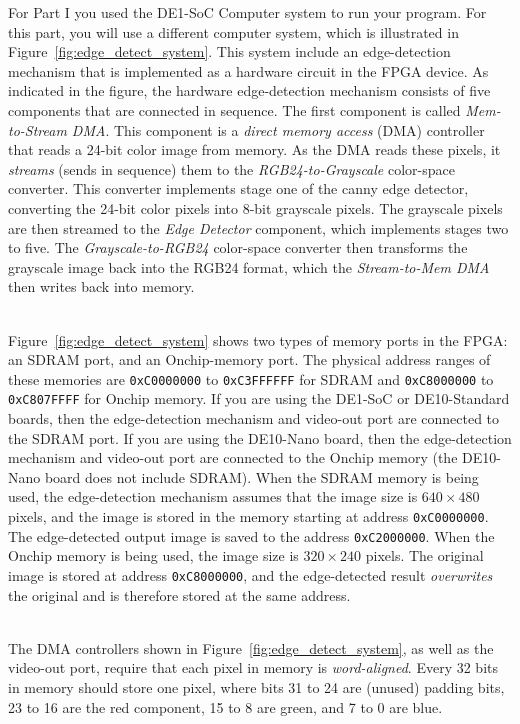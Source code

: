 \documentclass[epsfig,10pt,fullpage]{article}
\begin{document}
For Part I you used the DE1-SoC Computer system to run your program. For this part, you will 
use a different computer system, which is illustrated in Figure~\ref{fig:edge_detect_system}.
This system include an edge-detection mechanism that is implemented as a hardware circuit 
in the FPGA device. As indicated in the figure, the hardware edge-detection mechanism 
consists of five components that are connected in sequence. The first component is called
{\it Mem-to-Stream DMA}. This component is a {\it direct memory access} (DMA) controller that 
reads a 24-bit color image from memory. As the DMA reads these pixels, it
{\it streams} (sends in sequence) them to the {\it RGB24-to-Grayscale} color-space converter.
This converter implements stage one of the canny edge detector, converting the 24-bit color 
pixels into 8-bit grayscale pixels. The grayscale pixels are then streamed to the 
{\it Edge Detector} component, which implements stages two to five. The 
{\it Grayscale-to-RGB24} color-space converter then transforms the grayscale image back into 
the RGB24 format, which the {\it Stream-to-Mem DMA} then writes back into memory. 

~\\
\noindent
Figure~\ref{fig:edge_detect_system} shows two types of memory ports in the FPGA: an SDRAM
port, and an Onchip-memory port. The physical address ranges of these memories are
\texttt{0xC0000000} to \texttt{0xC3FFFFFF} for SDRAM and \texttt{0xC8000000} to
\texttt{0xC807FFFF} for Onchip memory. If you are using the DE1-SoC or DE10-Standard
boards, then the edge-detection mechanism and video-out port are connected to the SDRAM port.
If you are using the DE10-Nano board, then the edge-detection mechanism and video-out port 
are connected to the Onchip memory (the DE10-Nano board does not include SDRAM). When the 
SDRAM memory is being used, the edge-detection mechanism assumes that the image size is 
$640 \times 480$ pixels, and the image is stored in the memory starting at address
\texttt{0xC0000000}. The edge-detected output image is saved to the address \texttt{0xC2000000}.
When the Onchip memory is being used, the image size is $320 \times 240$ pixels. The
original image is stored at address \texttt{0xC8000000}, and the edge-detected result
{\it overwrites} the original and is therefore stored at the same address.

~\\
\noindent
The DMA controllers shown in Figure~\ref{fig:edge_detect_system}, as well as the video-out port, 
require that each pixel in memory is {\it word-aligned}. Every 32 bits in memory should store 
one pixel, where bits 31 to 24 are (unused) padding bits, 23 to 16 are the red component, 
15 to 8 are green, and 7 to 0 are blue. 
\end{document}
